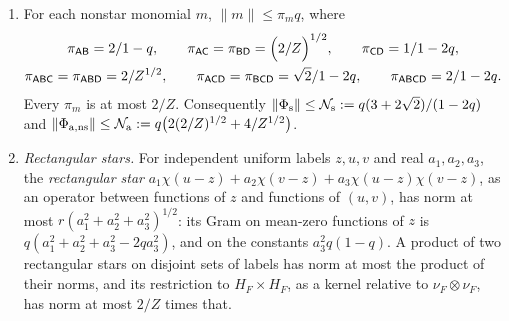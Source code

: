 \begin{lemma}\label{lem:record:projected-nonstar}
\begin{enumerate}[label=(\alph*)]
\item For each nonstar monomial $m$, $\|m\|\le\pi_mq$, where
 \[
 \begin{gathered}
  \pi_{\mathsf A\mathsf B}=\frac2{1-q},\qquad
  \pi_{\mathsf A\mathsf C}=\pi_{\mathsf B\mathsf D}=\Bigl(\frac2Z\Bigr)^{1/2},\qquad
  \pi_{\mathsf C\mathsf D}=\frac1{1-2q},\\
  \pi_{\mathsf A\mathsf B\mathsf C}=\pi_{\mathsf A\mathsf B\mathsf D}=\frac2{Z^{1/2}},\qquad
  \pi_{\mathsf A\mathsf C\mathsf D}=\pi_{\mathsf B\mathsf C\mathsf D}=\frac{\sqrt2}{1-2q},\qquad
  \pi_{\mathsf A\mathsf B\mathsf C\mathsf D}=\frac2{1-2q}.
 \end{gathered}
 \]
 Every $\pi_m$ is at most $2/Z$. Consequently
 $\|\Phi_{\rm s}\|\le\mathcal N_{\rm s}:=q(3+2\sqrt2)/(1-2q)$ and
 $\|\Phi_{\rm a,ns}\|\le\mathcal N_{\rm a}:=q\bigl(2(2/Z)^{1/2}+4/Z^{1/2}\bigr)$.
\item \emph{Rectangular stars.} For independent uniform labels $z,u,v$ and real
 $a_1,a_2,a_3$, the \emph{rectangular star}
 $a_1\chi(u-z)+a_2\chi(v-z)+a_3\chi(u-z)\chi(v-z)$, as an operator between
 functions of $z$ and functions of $(u,v)$, has norm at most
 $r(a_1^2+a_2^2+a_3^2)^{1/2}$: its Gram on mean-zero functions of $z$ is
 $q(a_1^2+a_2^2+a_3^2-2qa_3^2)$, and on the constants $a_3^2q(1-q)$. A product of
 two rectangular stars on disjoint sets of labels has norm at most the product
 of their norms, and its restriction to $H_F\times H_F$, as a kernel relative to
 $\nu_F\otimes\nu_F$, has norm at most $2/Z$ times that.
\end{enumerate}
\end{lemma}

